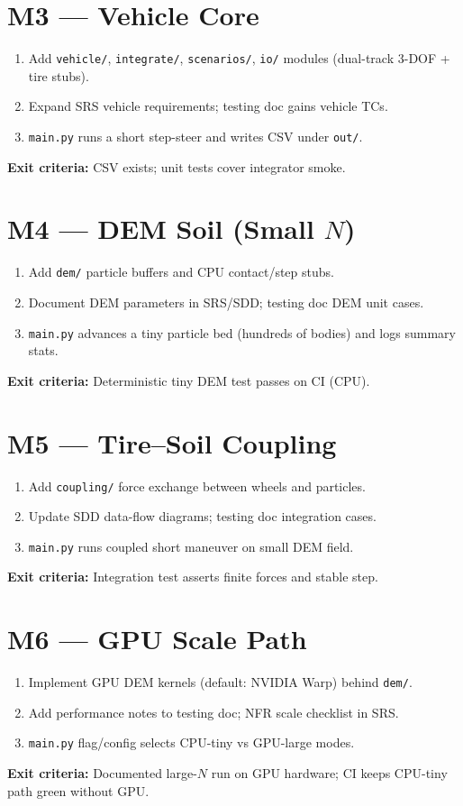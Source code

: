 \documentclass[conference]{IEEEtran}
\begin{document}
\section{M3 --- Vehicle Core}
\begin{enumerate}
  \item Add \texttt{vehicle/}, \texttt{integrate/}, \texttt{scenarios/},
        \texttt{io/} modules (dual-track 3-DOF + tire stubs).
  \item Expand SRS vehicle requirements; testing doc gains vehicle TCs.
  \item \texttt{main.py} runs a short step-steer and writes CSV under
        \texttt{out/}.
\end{enumerate}
\textbf{Exit criteria:} CSV exists; unit tests cover integrator smoke.

\section{M4 --- DEM Soil (Small $N$)}
\begin{enumerate}
  \item Add \texttt{dem/} particle buffers and CPU contact/step stubs.
  \item Document DEM parameters in SRS/SDD; testing doc DEM unit cases.
  \item \texttt{main.py} advances a tiny particle bed (hundreds of bodies)
        and logs summary stats.
\end{enumerate}
\textbf{Exit criteria:} Deterministic tiny DEM test passes on CI (CPU).

\section{M5 --- Tire--Soil Coupling}
\begin{enumerate}
  \item Add \texttt{coupling/} force exchange between wheels and particles.
  \item Update SDD data-flow diagrams; testing doc integration cases.
  \item \texttt{main.py} runs coupled short maneuver on small DEM field.
\end{enumerate}
\textbf{Exit criteria:} Integration test asserts finite forces and stable step.

\section{M6 --- GPU Scale Path}
\begin{enumerate}
  \item Implement GPU DEM kernels (default: NVIDIA Warp) behind \texttt{dem/}.
  \item Add performance notes to testing doc; NFR scale checklist in SRS.
  \item \texttt{main.py} flag/config selects CPU-tiny vs GPU-large modes.
\end{enumerate}
\textbf{Exit criteria:} Documented large-$N$ run on GPU hardware; CI keeps
CPU-tiny path green without GPU.
\end{document}

